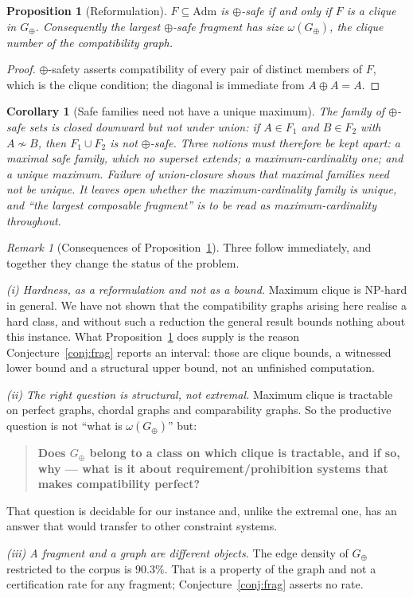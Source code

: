 \documentclass[11pt,reqno]{amsart}
\theoremstyle{plain}
\newtheorem{proposition}[theorem]{Proposition}
\newtheorem{corollary}[theorem]{Corollary}
\theoremstyle{definition}
\theoremstyle{remark}
\newtheorem{remark}[theorem]{Remark}
\newcommand{\Admf}{\mathrm{Adm}}
\begin{document}
\begin{proposition}[Reformulation]\label{prop:clique}
$F \subseteq \Admf$ is $\oplus$-safe if and only if $F$ is a clique in
$G_\oplus$. Consequently the largest $\oplus$-safe fragment has size
$\omega(G_\oplus)$, the clique number of the compatibility graph.
\end{proposition}

\begin{proof}
$\oplus$-safety asserts compatibility of every pair of distinct members of $F$,
which is the clique condition; the diagonal is immediate from $A \oplus A = A$.
\end{proof}

\begin{corollary}[Safe families need not have a unique maximum]\label{cor:nomax}
The family of $\oplus$-safe sets is closed downward but not under union: if
$A \in F_1$ and $B \in F_2$ with $A \not\sim B$, then $F_1 \cup F_2$ is not
$\oplus$-safe. Three notions must therefore be kept apart: a \emph{maximal} safe
family, which no superset extends; a \emph{maximum-cardinality} one; and a
\emph{unique} maximum. Failure of union-closure shows that maximal families need
not be unique. It leaves open whether the maximum-cardinality family is unique,
and ``the largest composable fragment'' is to be read as maximum-cardinality
throughout.
\end{corollary}

\begin{remark}[Consequences of Proposition~\ref{prop:clique}]
Three follow immediately, and together they change the status of the problem.

\emph{(i) Hardness, as a reformulation and not as a bound.} Maximum clique is
NP-hard in general. We have not shown that the compatibility graphs arising here
realise a hard class, and without such a reduction the general result bounds
nothing about this instance. What Proposition~\ref{prop:clique} does supply is
the reason Conjecture~\ref{conj:frag} reports an interval: those are clique
bounds, a witnessed lower bound and a structural upper bound, not an unfinished
computation.

\emph{(ii) The right question is structural, not extremal.} Maximum clique is
tractable on perfect graphs, chordal graphs and comparability graphs. So the
productive question is not ``what is $\omega(G_\oplus)$'' but:
\begin{quote}
  \textbf{Does $G_\oplus$ belong to a class on which clique is tractable, and if
  so, why --- what is it about requirement/prohibition systems that makes
  compatibility perfect?}
\end{quote}
That question is decidable for our instance and, unlike the extremal one, has an
answer that would transfer to other constraint systems.

\emph{(iii) A fragment and a graph are different objects.} The edge density of
$G_\oplus$ restricted to the corpus is $90.3\%$. That is a property of the graph
and not a certification rate for any fragment; Conjecture~\ref{conj:frag}
asserts no rate.
\end{remark}
\end{document}
